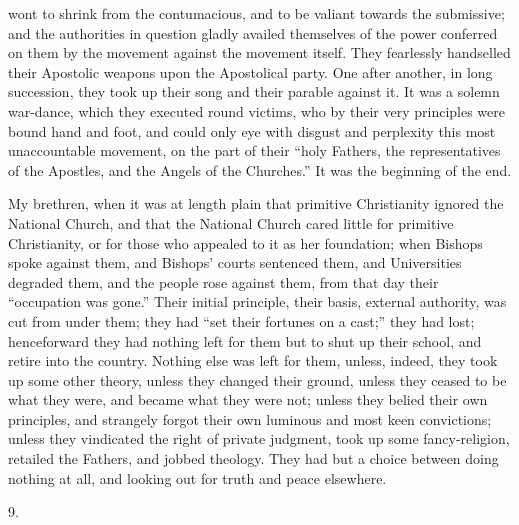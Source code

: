 wont to shrink from the contumacious, and to be valiant towards the
submissive; and the authorities in question gladly availed themselves
of the power conferred on them by the movement against the movement
itself. They fearlessly handselled their Apostolic weapons upon the
Apostolical party. One after another, in long succession, they took up
their song and their parable against it. It was a solemn war-dance,
which they executed round victims, who by their very principles were
bound hand and foot, and could only eye with disgust and perplexity
this most unaccountable movement, on the part of their ``holy
Fathers, the representatives of the Apostles, and the Angels of the
Churches.'' It was the beginning of the end.

My brethren, when it was at length plain that primitive
Christianity ignored the National Church, and that the National Church
cared little for primitive Christianity, or for those who appealed to
it as her foundation; when Bishops spoke against them, and Bishops'
courts sentenced them, and Universities degraded them, and the people
rose against them, from that day their ``occupation was gone.''
Their initial principle, their basis, external authority, was cut from
under them; they had ``set their fortunes on a cast;'' they
had lost; henceforward they had nothing left for them but to shut up
their school, and retire into the country. Nothing else was left for
them, unless, indeed, they took up some other theory, unless they
changed their ground, unless they ceased to be what they were, and
became what they were not; unless they belied their own principles,
and strangely forgot their own luminous and most keen convictions;
unless they vindicated the right of private judgment, took up some
fancy-religion, retailed the Fathers, and jobbed theology. They had
but a choice between doing nothing at all, and looking out for truth
and peace elsewhere.

9.

